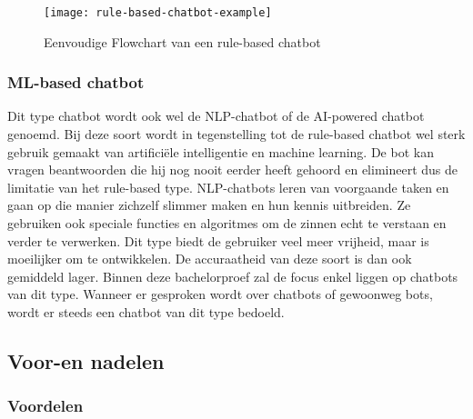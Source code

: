 \begin{figure}[!htbp]
    \label{fig:rule-based-chatbot-example}
    \centering
    \texttt{[image: rule-based-chatbot-example]}
    \caption{Eenvoudige Flowchart van een rule-based chatbot \autocite{Shridhar2017}}
\end{figure}

\subsubsection{ML-based chatbot}
\label{subsubsec:chatbots-soorten-ml-based-chatbot}


Dit type chatbot wordt ook wel de NLP-chatbot of de AI-powered chatbot genoemd. Bij deze soort wordt in tegenstelling tot de rule-based chatbot wel sterk gebruik gemaakt van artificiële intelligentie en machine learning. De bot kan vragen beantwoorden die hij nog nooit eerder heeft gehoord en elimineert dus de limitatie van het rule-based type. NLP-chatbots leren van voorgaande taken en gaan op die manier zichzelf slimmer maken en hun kennis uitbreiden. Ze gebruiken ook speciale functies en algoritmes om de zinnen echt te verstaan en verder te verwerken. Dit type biedt de gebruiker veel meer vrijheid, maar is moeilijker om te ontwikkelen. De accuraatheid van deze soort is dan ook gemiddeld lager. Binnen deze bachelorproef zal de focus enkel liggen op chatbots van dit type. Wanneer er gesproken wordt over chatbots of gewoonweg bots, wordt er steeds een chatbot van dit type bedoeld.

\subsection{Voor-en nadelen}
\label{subsec:chatbots-voor-en-nadelen}

\subsubsection{Voordelen}
\label{subsubsec:chatbots-voor-en-nadelen-voordelen}

